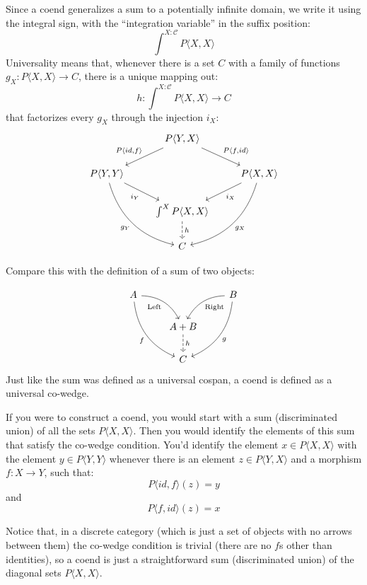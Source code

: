 \documentclass[DaoFP]{subfiles}
\begin{document}
Since a coend generalizes a sum to a potentially infinite domain, we write it using the integral sign, with the ``integration variable'' in the suffix position:
\[ \int^{X\colon \mathcal{C}} P \langle X, X \rangle \]
Universality means that, whenever there is a set $C$ with a family of functions $g_X \colon P \langle X, X \rangle \to C$, there is a unique mapping out:
\[ h \colon \int^{X\colon \mathcal{C}} P \langle X, X \rangle \to C \]
that factorizes every $g_X$ through the injection $i_X$:
\[
 \begin{tikzcd}
 &P \langle Y, X \rangle
 \arrow[ld, "{P \langle id, f \rangle}"']
 \arrow[rd, "{P \langle f, id \rangle}"]
 \\
 P \langle Y, Y \rangle
 \arrow[dr, "i_Y"']
 \arrow[ddr, bend right,  "g_Y"']
 &&P \langle X, X \rangle
 \arrow[dl, "i_X"]
 \arrow[ddl, bend left,  "g_X"]
 \\
 &\int^X P \langle X, X \rangle
 \arrow[d, dashed, "h"]
 \\
 &C
 \end{tikzcd}
\]

Compare this with the definition of a sum of two objects:

\[
 \begin{tikzcd}
 A
 \arrow[dr,  bend left, "\text{Left}"']
 \arrow[ddr, bend right, "f"']
 && B
 \arrow[dl, bend right, "\text{Right}"]
 \arrow[ddl, bend left, "g"]
 \\
&A + B
\arrow[d, dashed, "h"]
\\
& C
 \end{tikzcd}
\]
Just like the sum was defined as a universal cospan, a coend is defined as a universal co-wedge. 

If you were to construct a coend, you would start with a sum (discriminated union) of all the sets $P \langle X, X \rangle$. Then you would identify the elements of this sum that satisfy the co-wedge condition. You'd identify the element $x \in P \langle X, X \rangle$ with the element $y \in P \langle Y, Y \rangle$ whenever there is an element $z  \in P \langle Y, X \rangle$ and a morphism $f \colon X \to Y$, such that:
\[ P \langle id, f \rangle (z) = y\]
and
\[ P \langle f, id \rangle (z) = x\]

Notice that, in a discrete category (which is just a set of objects with no arrows between them) the co-wedge condition is trivial (there are no $f$s other than identities), so a coend is just a straightforward sum (discriminated union) of the diagonal sets $P \langle X, X \rangle$.
\end{document}
